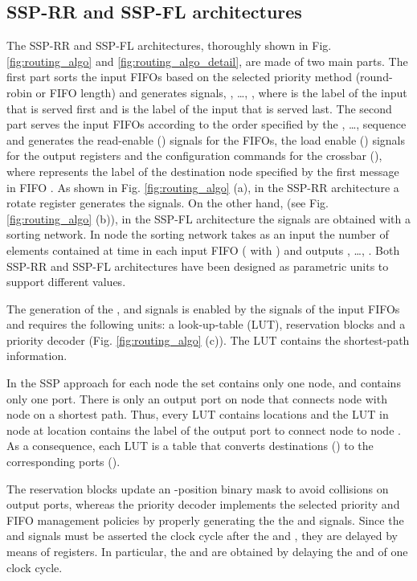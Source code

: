 \documentclass[10pt,twocolumn,journal]{IEEEtran}
\begin{document}
\subsection{SSP-RR and SSP-FL architectures}
\label{subsec:SSP}
The SSP-RR and SSP-FL architectures, thoroughly shown in Fig. \ref{fig:routing_algo} and \ref{fig:routing_algo_detail}, 
are made of two main parts. 
The first part sorts the input FIFOs based on the selected priority method (round-robin or FIFO length) and 
generates  signals, , \dots, , where 
 is the label of the input that is served first and 
 is the label of the input that is served last. 
The second part serves the input FIFOs according to the order specified by the 
, \dots,   sequence and 
generates the read-enable () signals for the FIFOs, 
the load enable () signals for the output registers and 
the configuration commands for the crossbar (), 
where   represents the label of the destination node specified 
by the first message in FIFO .
As shown in Fig. \ref{fig:routing_algo} (a), 
in the SSP-RR architecture a rotate register generates the  
signals. On the other hand, (see Fig. \ref{fig:routing_algo} (b)), in the SSP-FL architecture the  
signals are obtained with a sorting network. In node  the sorting network takes as an input the number of elements 
contained at time  in each input FIFO ( with ) and outputs 
, \dots, 
. Both SSP-RR and SSP-FL architectures have been 
designed as parametric units to support different  values.

The generation of the ,  and  signals is enabled by the 
 signals of the input FIFOs and requires the following units:  
a look-up-table (LUT),  reservation blocks and a priority decoder (Fig. \ref{fig:routing_algo} (c)). 
The LUT contains the shortest-path information. 

In the SSP approach for each node  the  set contains only one node, and  
 contains only one port. There is only an output port on node  that connects 
node  with node  on a shortest path. Thus, every LUT contains  locations and the LUT in node  
at location  contains the label of the output port to connect node  to node . 
As a consequence, each LUT is a  table that converts  destinations 
() to the corresponding ports ().

The reservation blocks update an -position binary mask to avoid collisions on output ports, whereas the 
priority decoder implements the selected priority and FIFO management policies by properly generating the 
the  and  signals. 
Since the  and  signals 
must be asserted the clock cycle after the  and , they are delayed by means of registers. 
In particular, the  and  are obtained by delaying the  and  of one clock cycle.
\end{document}

